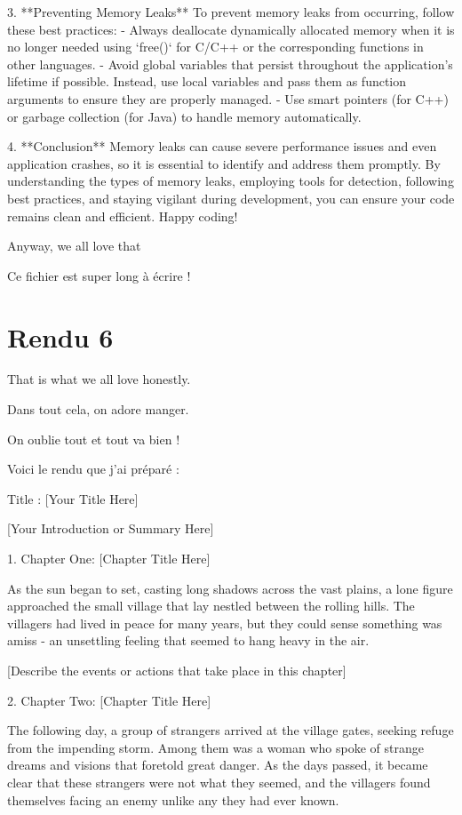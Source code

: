 \documentclass{mytex}
\begin{document}
3. **Preventing Memory Leaks**
   To prevent memory leaks from occurring, follow these best practices:
   - Always deallocate dynamically allocated memory when it is no longer needed using `free()` for C/C++ or the corresponding functions in other languages.
   - Avoid global variables that persist throughout the application's lifetime if possible. Instead, use local variables and pass them as function arguments to ensure they are properly managed.
   - Use smart pointers (for C++) or garbage collection (for Java) to handle memory automatically.

4. **Conclusion**
   Memory leaks can cause severe performance issues and even application crashes, so it is essential to identify and address them promptly. By understanding the types of memory leaks, employing tools for detection, following best practices, and staying vigilant during development, you can ensure your code remains clean and efficient. Happy coding!

Anyway, we all love that

Ce fichier est super long à écrire !
\section{Rendu 6}

That is what we all love honestly.

Dans tout cela, on adore manger.

On oublie tout et tout va bien !

Voici le rendu que j'ai préparé :

Title : [Your Title Here]

[Your Introduction or Summary Here]

1. Chapter One: [Chapter Title Here]

   As the sun began to set, casting long shadows across the vast plains, a lone figure approached the small village that lay nestled between the rolling hills. The villagers had lived in peace for many years, but they could sense something was amiss - an unsettling feeling that seemed to hang heavy in the air.

   [Describe the events or actions that take place in this chapter]

2. Chapter Two: [Chapter Title Here]

   The following day, a group of strangers arrived at the village gates, seeking refuge from the impending storm. Among them was a woman who spoke of strange dreams and visions that foretold great danger. As the days passed, it became clear that these strangers were not what they seemed, and the villagers found themselves facing an enemy unlike any they had ever known.
\end{document}
